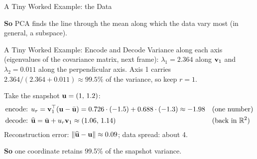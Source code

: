\documentclass[10pt,aspectratio=169]{ntuabeamer}
\newcommand{\takeaway}[1]{\par\vspace{0.7em}\textcolor{ntuablue}{\textbf{So} #1}\par}
\begin{document}
\begin{frame}{A Tiny Worked Example: the Data}
  \small
  {
    \begin{center}
    \end{center}
  }

  \takeaway{PCA finds the line through the mean along which the data vary most (in general, a subspace).}
\end{frame}

\begin{frame}{A Tiny Worked Example: Encode and Decode}
  \small
  Variance along each axis (eigenvalues of the covariance matrix, next frame):
  \(\lambda_1=2.364\) along \(\mathbf{v}_1\) and \(\lambda_2=0.011\) along the perpendicular axis.
  Axis 1 carries \(2.364/(2.364+0.011)\approx 99.5\%\) of the variance, so keep \(r=1\).

  \medskip
  Take the snapshot \(\mathbf{u}=(1,\,1.2)\):
  \begin{align*}
    \text{encode: } & u_r=\mathbf{v}_1^{\top}(\mathbf{u}-\bar{\mathbf{u}})
      = 0.726\cdot(-1.5)+0.688\cdot(-1.3)\approx -1.98
      && \text{(one number)}\\
    \text{decode: } & \widehat{\mathbf{u}}=\bar{\mathbf{u}}+u_r\mathbf{v}_1\approx(1.06,\,1.14)
      && \text{(back in } \mathbb{R}^2\text{)}
  \end{align*}
  Reconstruction error: \(\|\widehat{\mathbf{u}}-\mathbf{u}\|\approx0.09\); data spread: about 4.

  \takeaway{one coordinate retains 99.5\% of the snapshot variance.}
\end{frame}
\end{document}
